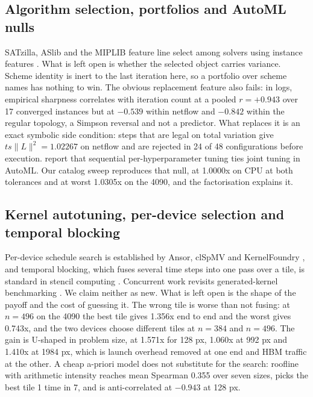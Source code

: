 \subsection{Algorithm selection, portfolios and AutoML nulls}

SATzilla, ASlib and the MIPLIB feature line select among solvers using instance
features \citep{Xu2008SATzilla,BischlASlib2016,Gleixner2021MIPLIB}. What is left
open is whether the selected object carries variance. Scheme identity is inert
to the last iteration here, so a portfolio over scheme names has nothing to
win.
The obvious replacement feature also fails: in logs, empirical sharpness
correlates with iteration count at a pooled $r=+0.943$ over 17 converged
instances but at $-0.539$ within netflow and $-0.842$ within the regular
topology, a Simpson reversal and not a predictor.
What replaces it is an exact symbolic side condition: steps that are legal on
total variation give $t s \|L\|^2 = 1.02267$ on netflow and are rejected in 24 of
48 configurations before execution.
\citet{PushakHoos2022} report that sequential per-hyperparameter tuning ties
joint tuning in AutoML. Our catalog sweep reproduces that null, at 1.0000x on
CPU at both tolerances and at worst 1.0305x on the 4090, and the factorisation
explains it.

\subsection{Kernel autotuning, per-device selection and temporal blocking}

Per-device schedule search is established by Ansor, clSpMV and KernelFoundry
\citep{Zheng2020Ansor,Su2012clSpMV,KernelFoundry2026}, and temporal blocking,
which fuses several time steps into one pass over a tile, is standard in stencil
computing \citep{Wolf1991TemporalBlocking}. Concurrent work revisits
generated-kernel benchmarking \citep{KernelBenchVerified2026}. We claim neither
as new. What is left open is the shape of the payoff and the cost of guessing
it.
The wrong tile is worse than not fusing: at $n=496$ on the 4090 the best tile
gives 1.356x end to end and the worst gives 0.743x, and the two devices choose
different tiles at $n=384$ and $n=496$.
The gain is U-shaped in problem size, at 1.571x for 128 px, 1.060x at 992 px and
1.410x at 1984 px, which is launch overhead removed at one end and HBM traffic
at the other.
A cheap a-priori model does not substitute for the search: roofline with
arithmetic intensity reaches mean Spearman 0.355 over seven sizes, picks the
best tile 1 time in 7, and is anti-correlated at $-0.943$ at 128 px.

